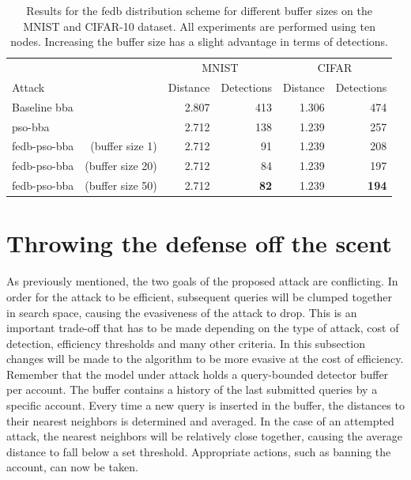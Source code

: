 \begin{table}
\centering
\caption[Results for different buffer sizes]{Results for the \gls{fedb} distribution scheme for different buffer sizes on the MNIST and CIFAR-10 dataset. All experiments are performed using ten nodes. Increasing the buffer size has a slight advantage in terms of detections.}
\label{tbl:history_len}
\begin{tabular}{lrrrrr}\toprule
			&& \multicolumn{2}{c}{MNIST} &\multicolumn{2}{c}{CIFAR} \\ \cmidrule(r){3-4} \cmidrule(r){5-6}
	Attack				&&Distance	&Detections	&Distance	&Detections \\ \midrule
	Baseline \gls{bba}							&&2.807	&413	&1.306	&474 \\
	\gls{pso}-\gls{bba} 						&&2.712	&138	&1.239	&257 \\ \addlinespace[\linespace]
	\gls{fedb}-\gls{pso}-\gls{bba} &(buffer size 1)	&2.712	&91		&1.239	&208 \\
	\gls{fedb}-\gls{pso}-\gls{bba} &(buffer size 20)	&2.712	&84		&1.239	&197 \\
	\gls{fedb}-\gls{pso}-\gls{bba} &(buffer size 50)	&2.712	&\textbf{82}		&1.239	&\textbf{194} \\
	\bottomrule
	\end{tabular}
\end{table}


\section{Throwing the defense off the scent}\label{sec:noise_insertion}
As previously mentioned, the two goals of the proposed attack are conflicting. In order for the attack to be efficient, subsequent queries will be clumped together in search space, causing the evasiveness of the attack to drop. This is an important trade-off that has to be made depending on the type of attack, cost of detection, efficiency thresholds and many other criteria. In this subsection changes will be made to the algorithm to be more evasive at the cost of efficiency.\\

Remember that the model under attack holds a query-bounded detector buffer per account. The buffer contains a history of the last submitted queries by a specific account. Every time a new query is inserted in the buffer, the distances to their nearest neighbors is determined and averaged. In the case of an attempted attack, the nearest neighbors will be relatively close together, causing the average distance to fall below a set threshold. Appropriate actions, such as banning the account, can now be taken.\\


